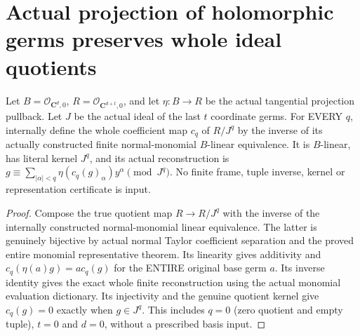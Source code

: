 \section{Actual projection of holomorphic germs preserves whole ideal quotients}

\begin{lemma}
\label{hir:submersion-projection-colon-actual-coefficients}
\leanok
{}
Let $B=\mathcal O_{\mathbf C^d,0}$, $R=\mathcal O_{\mathbf C^{d+t},0}$,
and let $\eta:B\to R$ be the actual tangential projection pullback. Let
$J$ be the actual ideal of the last $t$ coordinate germs. For EVERY $q$,
internally define the whole coefficient map $c_q$ of $R/J^q$ by the inverse
of its actually constructed finite normal-monomial $B$-linear equivalence.
It is $B$-linear, has literal kernel $J^q$, and its actual reconstruction is
$g\equiv\sum_{|\alpha|<q}\eta(c_q(g)_\alpha)y^\alpha\pmod{J^q}$.
No finite frame, tuple inverse, kernel or representation certificate is input.
\end{lemma}
\begin{proof}
Compose the true quotient map $R\to R/J^q$ with the inverse of the internally
constructed normal-monomial linear equivalence. The latter is genuinely
bijective by actual normal Taylor coefficient separation and the proved
entire monomial representative theorem. Its linearity gives additivity and
$c_q(\eta(a)g)=a c_q(g)$ for the ENTIRE original base germ $a$. Its inverse
identity gives the exact whole finite reconstruction using the actual
monomial evaluation dictionary. Its injectivity and the genuine quotient
kernel give $c_q(g)=0$ exactly when $g\in J^q$. This includes $q=0$ (zero
quotient and empty tuple), $t=0$ and $d=0$, without a prescribed basis input.
\end{proof}


